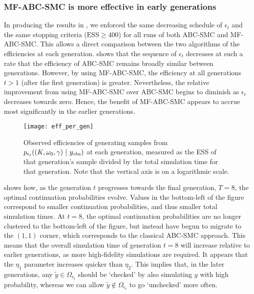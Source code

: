 \documentclass[review]{siamonline190516}
\begin{document}
\subsubsection{MF-ABC-SMC is more effective in early generations}
\label{s:Results:Generations} 

In producing the results in , we enforced the same decreasing schedule of $\epsilon_t$ and the same stopping criteria ($\mathrm{ESS} \geq 400$) for all runs of both ABC-SMC and MF-ABC-SMC.
This allows a direct comparison between the two algorithms of the efficiencies at each generation.
 shows that the sequence of $\epsilon_t$ decreases at such a rate that the efficiency of ABC-SMC remains broadly similar between generations.
However, by using MF-ABC-SMC, the efficiency at all generations $t>1$ (after the first generation) is greater.
Nevertheless, the relative improvement from using MF-ABC-SMC over ABC-SMC begins to diminish as $\epsilon_t$ decreases towards zero.
Hence, the benefit of MF-ABC-SMC appears to accrue most significantly in the earlier generations.

\begin{figure}
\centering
\texttt{[image: eff\_per\_gen]}
\caption{
Observed efficiencies of generating samples from $p_{\epsilon_t}((K, \omega_0, \gamma)~|~y_{\mathrm{obs}})$ at each generation, measured as the ESS of that generation's sample divided by the total simulation time for that generation.
Note that the vertical axis is on a logarithmic scale.
}
\label{fig:efficiencies_generation}
\end{figure}

 shows how, as the generation $t$ progresses towards the final generation, $T=8$, the optimal continuation probabilities evolve.
Values in the bottom-left of the figure correspond to smaller continuation probabilities, and thus smaller total simulation times.
At $t=8$, the optimal continuation probabilities are no longer clustered to the bottom-left of the figure, but instead have begun to migrate to the $(1,1)$ corner, which corresponds to the classical ABC-SMC approach.
This means that the overall simulation time of generation $t=8$ will increase relative to earlier generations, as more high-fidelity simulations are required.
It appears that the $\eta_1$ parameter increases quicker than $\eta_2$.
This implies that, in the later generations, any $\tilde y \in \Omega_{\epsilon_t}$ should be `checked' by also simulating $y$ with high probability, whereas we can allow $\tilde y \notin \Omega_{\epsilon_t}$ to go `unchecked' more often.
\end{document}
